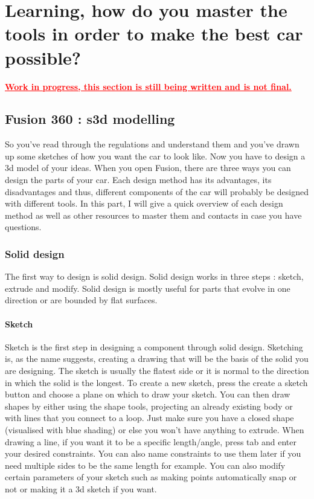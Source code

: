 \chapter{Learning, how do you master the tools in order to make the best car possible?}

\textcolor{red}{\underline{\textbf{Work in progress, this section is still being written and is not final.}}}

\section{Fusion 360 : s3d modelling}

So you’ve read through the regulations and understand them and you’ve drawn up some sketches of how you want the car to look like. Now you have to design a 3d model of your ideas. When you open Fusion, there are three ways you can design the parts of your car. Each design method has its advantages, its disadvantages and thus, different components of the car will probably be designed with different tools. In this part, I will give a quick overview of each design method as well as other resources to master them and contacts in case you have questions.

\subsection{Solid design}
The first way to design is solid design. Solid design works in three steps : sketch, extrude and modify. Solid design is mostly useful for parts that evolve in one direction or are bounded by flat surfaces. 

\subsubsection{Sketch}
Sketch is the first step in designing a component through solid design. Sketching is, as the name suggests, creating a drawing that will be the basis of the solid you are designing. The sketch is usually the flatest side or it is normal to the direction in which the solid is the longest. To create a new sketch, press the create a sketch button and choose a plane on which to draw your sketch. You can then draw shapes by either using the shape tools, projecting an already existing body or with lines that you connect to a loop. Just make sure you have a closed shape (visualised with blue shading) or else you won’t have anything to extrude. When drawing a line, if you want it to be a specific length/angle, press tab and enter your desired constraints. You can also name constraints to use them later if you need multiple sides to be the same length for example. You can also modify certain parameters of your sketch such as making points automatically snap or not or making it a 3d sketch if you want.


